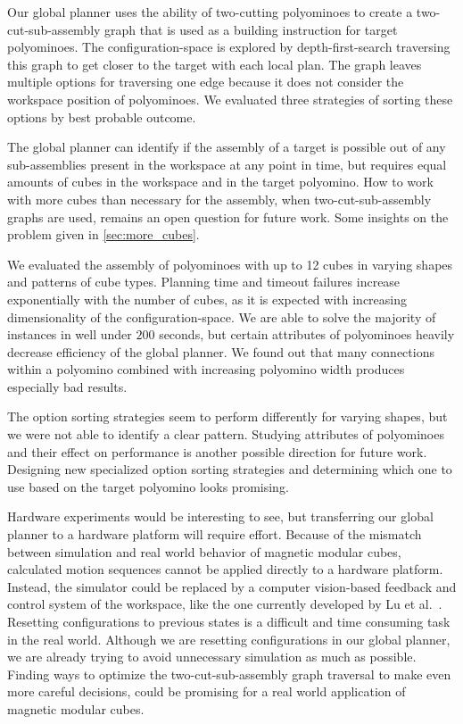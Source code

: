 Our global planner uses the ability of two-cutting polyominoes to create a two-cut-sub-assembly graph that is used as a building instruction for target polyominoes.
The configuration-space is explored by depth-first-search traversing this graph to get closer to the target with each local plan.
The graph leaves multiple options for traversing one edge because it does not consider the workspace position of polyominoes. 
We evaluated three strategies of sorting these options by best probable outcome.

The global planner can identify if the assembly of a target is possible out of any sub-assemblies present in the workspace at any point in time, but requires equal amounts of cubes in the workspace and in the target polyomino.
How to work with more cubes than necessary for the assembly, when two-cut-sub-assembly graphs are used, remains an open question for future work.
Some insights on the problem given in \autoref{sec:more_cubes}.

We evaluated the assembly of polyominoes with up to 12 cubes in varying shapes and patterns of cube types.
Planning time and timeout failures increase exponentially with the number of cubes, as it is expected with increasing dimensionality of the configuration-space.
We are able to solve the majority of instances in well under $200$ seconds, but certain attributes of polyominoes heavily decrease efficiency of the global planner.
We found out that many connections within a polyomino combined with increasing polyomino width produces especially bad results.

The option sorting strategies seem to perform differently for varying shapes, but we were not able to identify a clear pattern.
Studying attributes of polyominoes and their effect on performance is another possible direction for future work.
Designing new specialized option sorting strategies and determining which one to use based on the target polyomino looks promising. 

Hardware experiments would be interesting to see, but transferring our global planner to a hardware platform will require effort.
Because of the mismatch between simulation and real world behavior of magnetic modular cubes, calculated motion sequences cannot be applied directly to a hardware platform.
Instead, the simulator could be replaced by a computer vision-based feedback and control system of the workspace, like the one currently developed by Lu et al.\ \cite{Lu2023}.
Resetting configurations to previous states is a difficult and time consuming task in the real world.
Although we are resetting configurations in our global planner, we are already trying to avoid unnecessary simulation as much as possible.
Finding ways to optimize the two-cut-sub-assembly graph traversal to make even more careful decisions, could be promising for a real world application of magnetic modular cubes.







